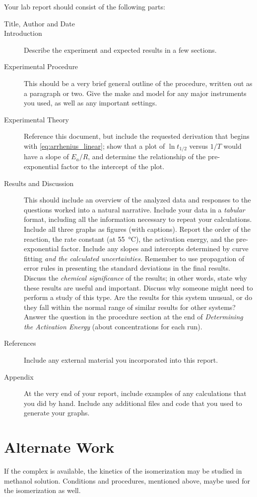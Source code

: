 Your lab report should consist of the following parts:
\begin{description}
	\item[Title, Author and Date]
	\item[Introduction] Describe the experiment and expected results in a few sections. 
	\item[Experimental Procedure] This should be a very brief general outline of the procedure, written out as a paragraph or two. Give the make and model for any major instruments you used, as well as any important settings.
	\item[Experimental Theory] Reference this document, but include the requested derivation that begins with \cref{eq:arrhenius_linear}; show that a plot of \(\ln{t_{1/2}}\) versus \(1/T\) would have a slope of \(E_a/R\), and determine the relationship of the pre-exponential factor to the intercept of the plot. 
	\item[Results and Discussion] This should include an overview of the analyzed data and responses to the questions worked into a natural narrative. 
	Include your data in a \emph{tabular} format, including all the information necessary to repeat your calculations. 
	Include all three graphs as figures (with captions). 
	Report the order of the reaction, the rate constant (at \qty{55}{\celsius}), the activation energy, and the pre-exponential factor. 
	Include any slopes and intercepts determined by curve fitting \emph{and the calculated uncertainties.} 
	Remember to use propagation of error rules in presenting the standard deviations in the final results. 
	Discuss the \emph{chemical significance} of the results; in other words, state why these results are useful and important. 
	Discuss why someone might need to perform a study of this type. 
	Are the results for this system unusual, or do they fall within the normal range of similar results for other systems?
	Answer the question in the procedure section at the end of \emph{Determining the Activation Energy} (about concentrations for each run). 
	\item[References] Include any external material you incorporated into this report. 
	\item[Appendix] At the very end of your report, include examples of any calculations that you did by hand. 
	Include any additional files and code that you used to generate your graphs.
\end{description}
 
 
 \section{Alternate Work}
 
 If the \iupac{\cis-} complex is available, the kinetics of the \iupac{\cis-\trans} isomerization may be studied in methanol solution. 
 Conditions and procedures, mentioned above, maybe used for the \iupac{\cis-\trans} isomerization as well. 
